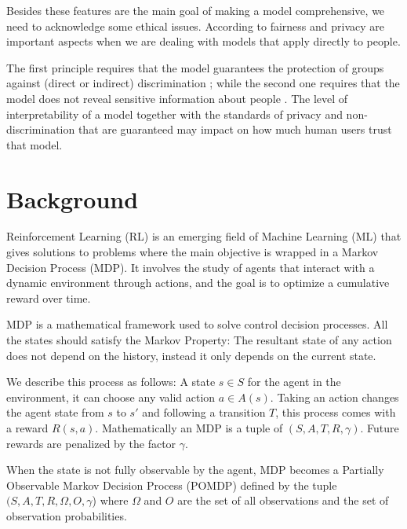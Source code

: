 \documentclass[runningheads]{llncs}
\begin{document}
Besides these features are the main goal of making a model comprehensive, we need to acknowledge some ethical issues. According to \cite{Andrews1995} \cite{Doshi-velez2017} fairness and privacy are important aspects when we are dealing with models that apply directly to people.

The first principle requires that the model guarantees the protection of groups against (direct or indirect) discrimination \cite{romei2014multidisciplinary}; while the second one requires that the model does not reveal sensitive information about people \cite{aldeen2015comprehensive}. The level of interpretability of a model together with the standards of privacy and non-discrimination that are guaranteed may impact on how much human users trust that model.\cite{Guidotti2018}


\section{Background}

Reinforcement Learning (RL) is an emerging field of Machine Learning (ML) that gives solutions to problems where the main objective is wrapped in a Markov Decision Process (MDP). It involves the study of agents that interact with a dynamic  environment through actions, and the goal is to optimize a cumulative reward over time.

MDP is a mathematical framework used to solve control decision processes. All the states should satisfy the Markov Property: The resultant state of any action does not depend on the history, instead it only depends on the current state.

We describe this process as follows: A state $s \in S$ for the agent in the environment, it can choose any valid action $a \in A(s)$. Taking an action changes the agent state from $s$ to $s'$ and following a transition $T$, this process comes with a reward $R(s,a)$. Mathematically an MDP is a tuple of $(S,A,T,R,\gamma)$. Future rewards are penalized by the factor $\gamma$. 

When the state is not fully observable by the agent, MDP becomes a Partially Observable Markov Decision Process (POMDP) defined by the tuple  $(S , A , T , R , \Omega , O , \gamma$) where $\Omega$ and $O$ are the set of all observations and the set of observation probabilities.
\end{document}
